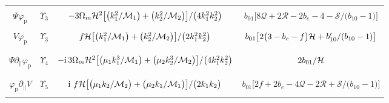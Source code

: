 \begin{longtable}{| c | c | c | c |}
&  &  & \\
$\Psi {\varphi_{\mathrm{p}}}$ & ${\Upsilon_{{3}}}$ & $-3\Omega_m \mathcal{H}^{2}\big[\big(k_{1}^{2}/\mathcal{M}_{1}\big)+\big(k_{2}^{2}/\mathcal{M}_{2}\big)\big]/{\big(4k_{1}^{2}k_{2}^{2}\big)}$ & 
${ b_{01}\big[8\mathcal{Q}+2\mathcal{R} -2b_{e}-4 -\mathcal{S}/\big(b_{10}-1\big)\big]}$ \\ 
&  &  & \\
$V{\varphi_{\mathrm{p}}}$ & ${\Upsilon_{{3}}}$ & $f\mathcal{H}\big[\big(k_{1}^{2}/\mathcal{M}_{1}\big)+\big(k_{2}^{2}/\mathcal{M}_{2}\big)\big]/{\big(2k_{1}^{2}k_{2}^{2}\big)}$ & ${b_{01}\big[ 2\big(3-b_e-f\big)\mathcal{H}+b_{10}'/(b_{10}-1) \big]}$ \\ 
&  &  & \\
\hline 
&  &  & \\
$\Psi \partial_{\parallel}{\varphi_{\mathrm{p}}}$& ${\Upsilon_{{4}}}$ & $-\mathrm{i}\,3\Omega_m \mathcal{H}^{2}\big[\big(\mu_1 k_{1}^{3}/\mathcal{M}_{1}\big)+\big(\mu_2 k_{2}^{3}/\mathcal{M}_{2}\big)\big]/{\big(4k_{1}^{2}k_{2}^{2}\big)}$ & ${2}b_{01}/{\mathcal{H}}$ \\
&  &  & \\
\hline 
&  &  & \\
${\varphi_{\mathrm{p}}}\partial_{\parallel} V$ & ${\Upsilon_{{5}}}$ & $\mathrm{i\,}\,f\mathcal{H}\big[\big(\mu_1 k_{2}/\mathcal{M}_{2}\big)+\big(\mu_2 k_{1}/\mathcal{M}_{1}\big)\big]/{\big(2k_{1}k_{2}\big)}$ & 
${ b_{01}\big[2f+2b_e-4\mathcal{Q}-2\mathcal{R} +\mathcal{S}/\big(b_{10}-1\big)\big]}$ \\
&  &  & \\
\hline
\end{longtable}
\endgroup